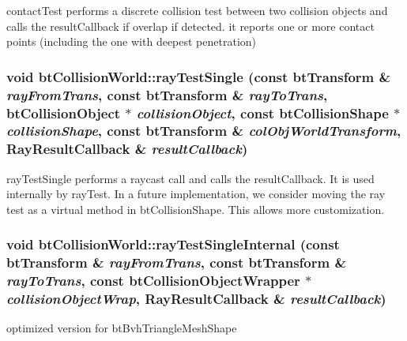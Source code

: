 contactTest performs a discrete collision test between two collision objects and calls the resultCallback if overlap if detected. it reports one or more contact points (including the one with deepest penetration) \hypertarget{classbt_collision_world_ca2a9413508b4a2449fe83ff93ea564e}{
\subsubsection[rayTestSingle]{\setlength{\rightskip}{0pt plus 5cm}void btCollisionWorld::rayTestSingle (const btTransform \& {\em rayFromTrans}, \/  const btTransform \& {\em rayToTrans}, \/  btCollisionObject $\ast$ {\em collisionObject}, \/  const btCollisionShape $\ast$ {\em collisionShape}, \/  const btTransform \& {\em colObjWorldTransform}, \/  {\bf RayResultCallback} \& {\em resultCallback})}}
\label{classbt_collision_world_ca2a9413508b4a2449fe83ff93ea564e}


rayTestSingle performs a raycast call and calls the resultCallback. It is used internally by rayTest. In a future implementation, we consider moving the ray test as a virtual method in btCollisionShape. This allows more customization. \hypertarget{classbt_collision_world_84bbeea09de9dc5c68e49826e58f7114}{
\subsubsection[rayTestSingleInternal]{\setlength{\rightskip}{0pt plus 5cm}void btCollisionWorld::rayTestSingleInternal (const btTransform \& {\em rayFromTrans}, \/  const btTransform \& {\em rayToTrans}, \/  const btCollisionObjectWrapper $\ast$ {\em collisionObjectWrap}, \/  {\bf RayResultCallback} \& {\em resultCallback})}}
\label{classbt_collision_world_84bbeea09de9dc5c68e49826e58f7114}




optimized version for btBvhTriangleMeshShape 

